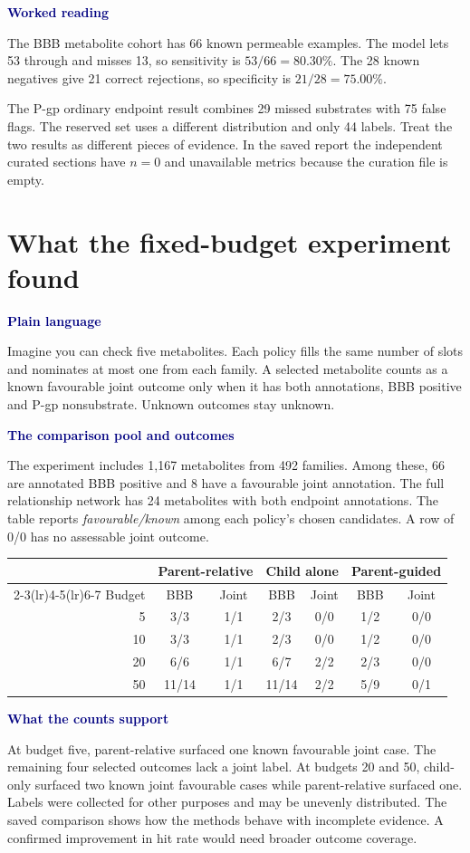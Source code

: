 \documentclass[11pt,a4paper]{article}
\newcommand{\lead}[1]{\par\smallskip\textbf{\textcolor{Navy}{#1}}\par\nobreak}
\newcommand{\pagehead}[1]{\clearpage\section{#1}}
\newcommand{\dense}{\small\renewcommand{\arraystretch}{1.11}\setlength{\tabcolsep}{4pt}}
\begin{document}
\lead{Worked reading}
The BBB metabolite cohort has 66 known permeable examples. The model lets 53 through and misses 13, so sensitivity is $53/66=80.30\%$. The 28 known negatives give 21 correct rejections, so specificity is $21/28=75.00\%$.

The P-gp ordinary endpoint result combines 29 missed substrates with 75 false flags. The reserved set uses a different distribution and only 44 labels. Treat the two results as different pieces of evidence. In the saved report the independent curated sections have $n=0$ and unavailable metrics because the curation file is empty.

\pagehead{What the fixed-budget experiment found}
\lead{Plain language}
Imagine you can check five metabolites. Each policy fills the same number of slots and nominates at most one from each family. A selected metabolite counts as a known favourable joint outcome only when it has both annotations, BBB positive and P-gp nonsubstrate. Unknown outcomes stay unknown.

\lead{The comparison pool and outcomes}
The experiment includes 1,167 metabolites from 492 families. Among these, 66 are annotated BBB positive and 8 have a favourable joint annotation. The full relationship network has 24 metabolites with both endpoint annotations. The table reports \emph{favourable/known} among each policy's chosen candidates. A row of 0/0 has no assessable joint outcome.

{\dense
\begin{center}
\begin{tabular}{rcccccc}
\toprule
& \multicolumn{2}{c}{Parent-relative} & \multicolumn{2}{c}{Child alone} & \multicolumn{2}{c}{Parent-guided}\\
\cmidrule(lr){2-3}\cmidrule(lr){4-5}\cmidrule(lr){6-7}
Budget & BBB & Joint & BBB & Joint & BBB & Joint\\
\midrule
5 & 3/3 & 1/1 & 2/3 & 0/0 & 1/2 & 0/0\\
10 & 3/3 & 1/1 & 2/3 & 0/0 & 1/2 & 0/0\\
20 & 6/6 & 1/1 & 6/7 & 2/2 & 2/3 & 0/0\\
50 & 11/14 & 1/1 & 11/14 & 2/2 & 5/9 & 0/1\\
\bottomrule
\end{tabular}
\end{center}}

\lead{What the counts support}
At budget five, parent-relative surfaced one known favourable joint case. The remaining four selected outcomes lack a joint label. At budgets 20 and 50, child-only surfaced two known joint favourable cases while parent-relative surfaced one. Labels were collected for other purposes and may be unevenly distributed. The saved comparison shows how the methods behave with incomplete evidence. A confirmed improvement in hit rate would need broader outcome coverage.
\end{document}
